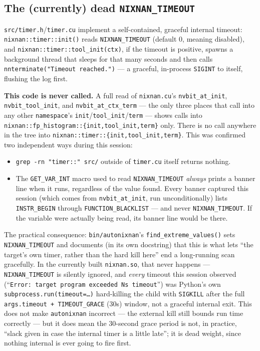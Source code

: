 \documentclass[11pt]{article}
\begin{document}
\subsection{The (currently) dead \texttt{NIXNAN\_TIMEOUT}}
\label{sec:timeout-dead}

\texttt{src/timer.h}/\texttt{timer.cu} implement a self-contained,
graceful internal timeout: \texttt{nixnan::timer::init()} reads
\texttt{NIXNAN\_TIMEOUT} (default 0, meaning disabled), and
\texttt{nixnan::timer::tool\_init(ctx)}, if the timeout is positive,
spawns a background thread that sleeps for that many seconds and then
calls \texttt{nnterminate("Timeout reached.")} --- a graceful,
in-process \texttt{SIGINT} to itself, flushing the log first.

\textbf{This code is never called.} A full read of \texttt{nixnan.cu}'s
\texttt{nvbit\_at\_init}, \texttt{nvbit\_tool\_init}, and
\texttt{nvbit\_at\_ctx\_term} --- the only three places that call into
any other \texttt{namespace}'s \texttt{init}/\texttt{tool\_init}/\texttt{term}
--- shows calls into \texttt{nixnan::fp\_histogram::\{init,tool\_init,term\}}
only. There is no call anywhere in the tree into
\texttt{nixnan::timer::\{init,tool\_init,term\}}. This was confirmed two
independent ways during this session:

\begin{itemize}
\item \texttt{grep -rn "timer::" src/} outside of \texttt{timer.cu} itself
  returns nothing.
\item The \texttt{GET\_VAR\_INT} macro used to read \texttt{NIXNAN\_TIMEOUT}
  \emph{always} prints a banner line when it runs, regardless of the
  value found. Every banner captured this session (which comes from
  \texttt{nvbit\_at\_init}, run unconditionally) lists
  \texttt{INSTR\_BEGIN} through \texttt{FUNCTION\_BLACKLIST} --- and never
  \texttt{NIXNAN\_TIMEOUT}. If the variable were actually being read, its
  banner line would be there.
\end{itemize}

The practical consequence: \texttt{bin/autonixnan}'s
\texttt{find\_extreme\_values()} sets \texttt{NIXNAN\_TIMEOUT} and
documents (in its own docstring) that this is what lets ``the target's
own timer, rather than the hard kill here'' end a long-running scan
gracefully. In the currently built \texttt{nixnan.so}, that never
happens --- \texttt{NIXNAN\_TIMEOUT} is silently ignored, and \emph{every}
timeout this session observed (``\texttt{Error: target program exceeded
Ns timeout}'') was Python's own \texttt{subprocess.run(timeout=\ldots)}
hard-killing the child with \texttt{SIGKILL} after the full
\texttt{args.timeout + TIMEOUT\_GRACE} (30s) window, not a graceful
internal exit. This does not make \texttt{autonixnan} incorrect --- the
external kill still bounds run time correctly --- but it does mean the
30-second grace period is not, in practice, ``slack given in case the
internal timer is a little late''; it is dead weight, since nothing
internal is ever going to fire first.
\end{document}
